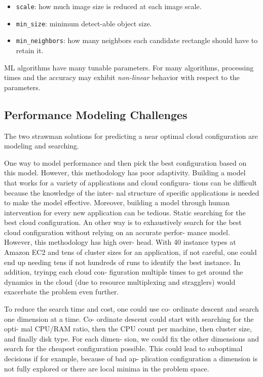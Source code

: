 \begin{itemize}[noitemsep, topsep=5pt]
\item \texttt{scale}: how much image size is reduced at each image scale.
\item \texttt{min\_size}: minimum detect-able object size.
\item \texttt{min\_neighbors}: how many neighbors each candidate rectangle should
  have to retain it.
\end{itemize}

ML algorithms have many tunable parameters. For many algorithms, processing
times and the accuracy may exhibit \textit{non-linear} behavior with respect to
the parameters.

\subsection{Performance Modeling Challenges}
\label{sec:challenges}

The two strawman solutions for predicting a near optimal cloud configuration are
modeling and searching.

 One way to
model performance and then pick the best configuration based on this
model. However, this methodology has poor adaptivity. Building a model that
works for a variety of applications and cloud configura- tions can be difficult
because the knowledge of the inter- nal structure of specific applications is
needed to make the model effective. Moreover, building a model through human
intervention for every new application can be tedious. Static searching for the
best cloud configuration. An other way is to exhaustively search for the best
cloud configuration without relying on an accurate perfor- mance model. However,
this methodology has high over- head. With 40 instance types at Amazon EC2 and
tens of cluster sizes for an application, if not careful, one could end up
needing tens if not hundreds of runs to identify the best instance. In addition,
tryinpg each cloud con- figuration multiple times to get around the dynamics in
the cloud (due to resource multiplexing and stragglers) would exacerbate the
problem even further.

To reduce the search time and cost, one could use co- ordinate descent and
search one dimension at a time. Co- ordinate descent could start with searching
for the opti- mal CPU/RAM ratio, then the CPU count per machine, then cluster
size, and finally disk type. For each dimen- sion, we could fix the other
dimensions and search for the cheapest configuration possible. This could lead
to suboptimal decisions if for example, because of bad ap- plication
configuration a dimension is not fully explored or there are local minima in the
problem space.

